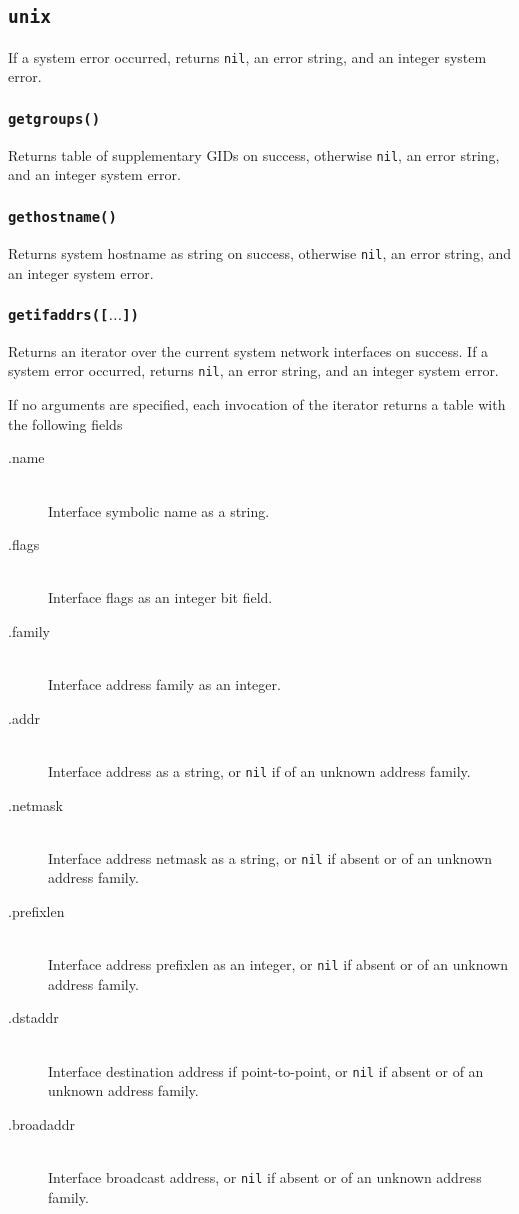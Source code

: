 \documentclass[11pt, oneside]{memoir}
\newcommand*{\nil}[0]{\texttt{nil}\xspace}
\newcommand*{\fn}[1]{\texttt{#1}\xspace}
\newcounter{toccols}
\newenvironment{Module}[1]{
	\subsection{\texttt{#1}}
	\addtocontents{toc}{
		\protect\begin{multicols}{\value{toccols}}
	}
}{
	\addtocontents{toc}{\protect\end{multicols}}
}
\begin{document}
\begin{Module}{unix}
If a system error occurred, returns \nil, an error string, and an integer system error.

\subsubsection[\fn{getgroups}]{\fn{getgroups()}}

Returns table of supplementary GIDs on success, otherwise \nil, an error string, and an integer system error.

\subsubsection[\fn{gethostname}]{\fn{gethostname()}}

Returns system hostname as string on success, otherwise \nil, an error string, and an integer system error.

\subsubsection[\fn{getifaddrs}]{\fn{getifaddrs([$\ldots$])}}

Returns an iterator over the current system network interfaces on success. If a system error occurred, returns \nil, an error string, and an integer system error.

If no arguments are specified, each invocation of the iterator returns a table with the following fields

\begin{description}
\item[.name] \hfill \\
Interface symbolic name as a string.
\item[.flags] \hfill \\
Interface flags as an integer bit field.
\item[.family] \hfill \\
Interface address family as an integer.
\item[.addr] \hfill \\
Interface address as a string, or \nil if of an unknown address family.
\item[.netmask] \hfill \\
Interface address netmask as a string, or \nil if absent or of an unknown address family.
\item[.prefixlen] \hfill \\
Interface address prefixlen as an integer, or \nil if absent or of an unknown address family.
\item[.dstaddr] \hfill \\
Interface destination address if point-to-point, or \nil if absent or of an unknown address family.
\item[.broadaddr] \hfill \\
Interface broadcast address, or \nil if absent or of an unknown address family.
\end{description}


\end{Module}
\end{document}
